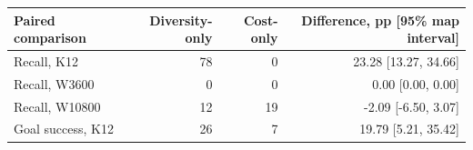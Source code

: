 \begin{tabular}{lrrr}
\toprule
Paired comparison & Diversity-only & Cost-only & Difference, pp [95\% map interval] \\
\midrule
Recall, K12 & 78 & 0 & 23.28 [13.27, 34.66] \\
Recall, W3600 & 0 & 0 & 0.00 [0.00, 0.00] \\
Recall, W10800 & 12 & 19 & -2.09 [-6.50, 3.07] \\
Goal success, K12 & 26 & 7 & 19.79 [5.21, 35.42] \\
\bottomrule
\end{tabular}
